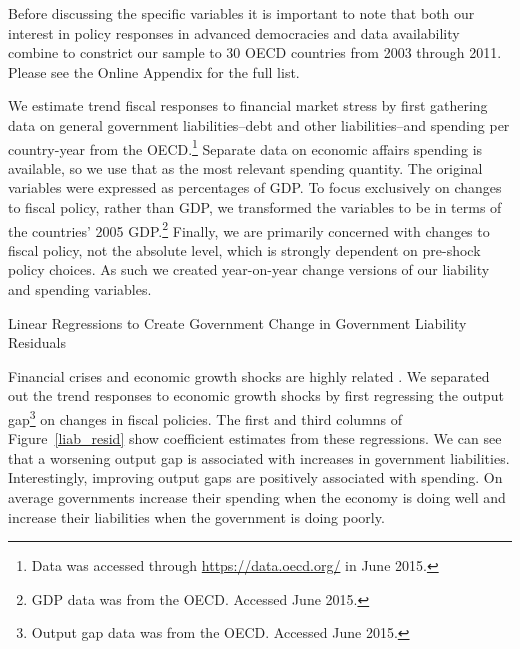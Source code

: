 \documentclass[]{article}
\begin{document}
Before discussing the specific variables it is important to note that both our interest in policy responses in advanced democracies and data availability combine to constrict our sample to 30 OECD countries from 2003 through 2011. Please see the Online Appendix for the full list.

We estimate trend fiscal responses to financial market stress by first gathering data on general government liabilities--debt and other liabilities--and spending per country-year from the OECD.\footnote{Data was accessed through \url{https://data.oecd.org/} in June 2015.} Separate data on economic affairs spending is available, so we use that as the most relevant spending quantity. The original variables were expressed as percentages of GDP. To focus exclusively on changes to fiscal policy, rather than GDP, we transformed the variables to be in terms of the countries' 2005 GDP.\footnote{GDP data was from the OECD. Accessed June 2015.} Finally, we are primarily concerned with changes to fiscal policy, not the absolute level, which is strongly dependent on pre-shock policy choices. As such we created year-on-year change versions of our liability and spending variables.

\begin{table}
    \caption{Linear Regressions to Create Government Change in Government Liability Residuals}
    \label{liab_resid}

    \begin{center}
        
    \end{center}

\end{table}

Financial crises and economic growth shocks are highly related \cite[see][]{Reinhart2009}. We separated out the trend responses to economic growth shocks by first regressing the output gap\footnote{Output gap data was from the OECD. Accessed June 2015.} on changes in fiscal policies. The first and third columns of Figure~\ref{liab_resid} show coefficient estimates from these regressions. We can see that a worsening output gap is associated with increases in government liabilities. Interestingly, improving output gaps are positively associated with spending. On average governments increase their spending when the economy is doing well and increase their liabilities when the government is doing poorly.
\end{document}
